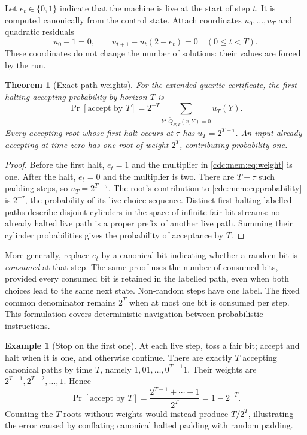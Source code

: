\documentclass[11pt,a4paper]{article}
\newtheorem{theorem}{Theorem}[section]
\theoremstyle{definition}
\newtheorem{example}[example]{Example}
\theoremstyle{remark}
\begin{document}
Let $e_t\in\{0,1\}$ indicate that the machine is live at the start of step $t$.
It is computed canonically from the control state. Attach coordinates
$u_0,\ldots,u_T$ and quadratic residuals
\begin{equation}\label{cdc:mem:eq:weight}
 u_0-1=0,\qquad u_{t+1}-u_t(2-e_t)=0\quad(0\leq t<T).
\end{equation}
These coordinates do not change the number of solutions: their values are
forced by the run.
\begin{theorem}[Exact path weights]\label{cdc:mem:thm:probability}
For the extended quartic certificate, the first-halting accepting probability
by horizon $T$ is
\begin{equation}\label{cdc:mem:eq:probability}
 \Pr[\text{accept by }T]
 =2^{-T}\sum_{Y:\,\widetilde Q_{P,T}(x,Y)=0}u_T(Y).
\end{equation}
Every accepting root whose first halt occurs at $\tau$ has
$u_T=2^{T-\tau}$. An input already accepting at time zero has one root of weight
$2^T$, contributing probability one.
\end{theorem}
\begin{proof}
Before the first halt, $e_t=1$ and the multiplier in \eqref{cdc:mem:eq:weight} is one.
After the halt, $e_t=0$ and the multiplier is two. There are $T-\tau$ such
padding steps, so $u_T=2^{T-\tau}$. The root's contribution to
\eqref{cdc:mem:eq:probability} is $2^{-\tau}$, the probability of its live choice
sequence. Distinct first-halting labelled paths describe disjoint cylinders
in the space of infinite fair-bit streams: no already halted live path is a
proper prefix of another live path. Summing their cylinder probabilities gives
the probability of acceptance by $T$.
\end{proof}

More generally, replace $e_t$ by a canonical bit indicating whether a random
bit is \emph{consumed} at that step. The same proof uses the number of consumed
bits, provided every consumed bit is retained in the labelled path, even when
both choices lead to the same next state. Non-random steps have one label.
The fixed common denominator remains $2^T$ when at most one bit is consumed
per step. This formulation covers deterministic navigation between probabilistic
instructions.

\begin{example}[Stop on the first one]
At each live step, toss a fair bit; accept and halt when it is one, and otherwise
continue. There are exactly $T$ accepting canonical paths by time $T$, namely
$1,01,\ldots,0^{T-1}1$. Their weights are
$2^{T-1},2^{T-2},\ldots,1$. Hence
\[
 \Pr[\text{accept by }T]
 =\frac{2^{T-1}+\cdots+1}{2^T}=1-2^{-T}.
\]
Counting the $T$ roots without weights would instead produce $T/2^T$, illustrating
the error caused by conflating canonical halted padding with random padding.
\end{example}
\end{document}
